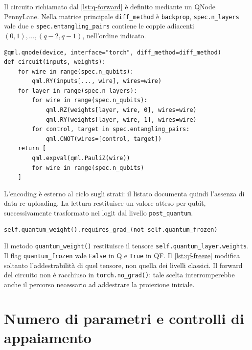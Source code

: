 Il circuito richiamato dal \cref{lst:q-forward} è definito mediante
un QNode PennyLane. Nella matrice principale \texttt{diff\_method}
è \texttt{backprop}, \texttt{spec.n\_layers} vale due e
\texttt{spec.entangling\_pairs} contiene le coppie adiacenti
\((0,1),\ldots,(q-2,q-1)\), nell'ordine indicato.

\begin{code}
\begin{verbatim}
@qml.qnode(device, interface="torch", diff_method=diff_method)
def circuit(inputs, weights):
    for wire in range(spec.n_qubits):
        qml.RY(inputs[..., wire], wires=wire)
    for layer in range(spec.n_layers):
        for wire in range(spec.n_qubits):
            qml.RZ(weights[layer, wire, 0], wires=wire)
            qml.RY(weights[layer, wire, 1], wires=wire)
        for control, target in spec.entangling_pairs:
            qml.CNOT(wires=[control, target])
    return [
        qml.expval(qml.PauliZ(wire))
        for wire in range(spec.n_qubits)
    ]
\end{verbatim}
\caption{Encoding singolo, strati variazionali e lettura del circuito.}
\label{lst:q-circuit}
\end{code}

L'encoding è esterno al ciclo sugli strati: il listato documenta
quindi l'assenza di data re-uploading. La lettura restituisce un valore
atteso per qubit, successivamente trasformato nei logit dal livello
\texttt{post\_quantum}.

\begin{code}
\begin{verbatim}
self.quantum_weight().requires_grad_(not self.quantum_frozen)
\end{verbatim}
\caption{Controllo dell'addestrabilità dei soli pesi circuitali.}
\label{lst:qf-freeze}
\end{code}

Il metodo \texttt{quantum\_weight()} restituisce il tensore
\texttt{self.quantum\_layer.weights}. Il flag
\texttt{quantum\_frozen} vale \texttt{False} in Q e \texttt{True}
in QF. Il \cref{lst:qf-freeze} modifica soltanto l'addestrabilità
di quel tensore, non quella dei livelli classici. Il forward del
circuito non è racchiuso in \texttt{torch.no\_grad()}: tale scelta
interromperebbe anche il percorso necessario ad addestrare la
proiezione iniziale.

\section{Numero di parametri e controlli di appaiamento}
\label{sec:capacita-appaiamento}

